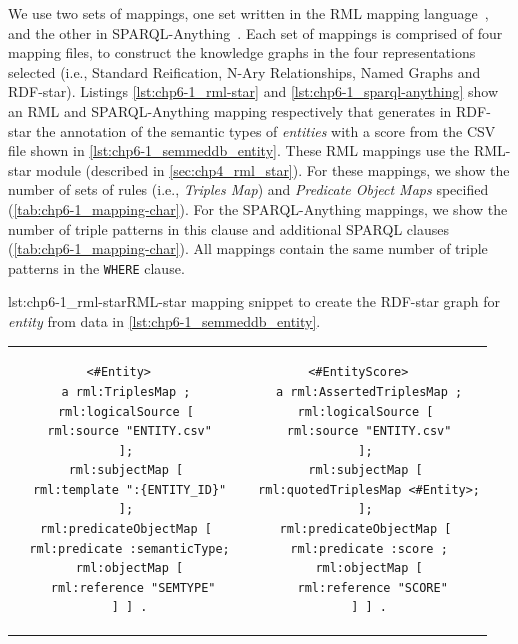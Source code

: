 We use two sets of mappings, one set written in the RML mapping language~\parencite{iglesias2023rml}, and the other in SPARQL-Anything~\parencite{asprino2023sparql-anything}. Each set of mappings is comprised of four mapping files, to construct the knowledge graphs in the four representations selected (i.e., Standard Reification, N-Ary Relationships, Named Graphs and RDF-star).
Listings \ref{lst:chp6-1_rml-star} and \ref{lst:chp6-1_sparql-anything} show an RML and SPARQL-Anything mapping respectively that generates in RDF-star the annotation of the semantic types of \textit{entities} with a score from the CSV file shown in \cref{lst:chp6-1_semmeddb_entity}. These RML mappings use the RML-star module (described in \cref{sec:chp4_rml_star}). For these mappings, we show the number of sets of rules (i.e., \textit{Triples Map}) and  \textit{Predicate Object Maps} specified (\cref{tab:chp6-1_mapping-char}). For the SPARQL-Anything mappings, we show the number of triple patterns in this clause and additional SPARQL clauses (\cref{tab:chp6-1_mapping-char}). All mappings contain the same number of triple patterns in the \texttt{WHERE} clause.



\noindent\begin{minipage}{1\linewidth}
\begin{captionedlisting}{lst:chp6-1_rml-star}{RML-star mapping snippet to create the RDF-star graph for \textit{entity} from data in \cref{lst:chp6-1_semmeddb_entity}. }
\centering
\begin{tabular}{cc}
{\begin{lstlisting}[basicstyle=\ttfamily\small,label={list:example1}]
<#Entity> 
 a rml:TriplesMap ;
 rml:logicalSource [
  rml:source "ENTITY.csv"
 ];
 rml:subjectMap [
  rml:template ":{ENTITY_ID}"
 ];
 rml:predicateObjectMap [
  rml:predicate :semanticType;
  rml:objectMap [
   rml:reference "SEMTYPE"
  ] ] .
\end{lstlisting}}
&
{\begin{lstlisting}[basicstyle=\ttfamily\small,label={list:example1},numbers=right,firstnumber=13]
<#EntityScore> 
  a rml:AssertedTriplesMap ;
 rml:logicalSource [
  rml:source "ENTITY.csv"
 ];
 rml:subjectMap [
  rml:quotedTriplesMap <#Entity>;
 ];
 rml:predicateObjectMap [
  rml:predicate :score ;
  rml:objectMap [
   rml:reference "SCORE"
  ] ] .
\end{lstlisting}}

\end{tabular}
\end{captionedlisting}
\end{minipage}


